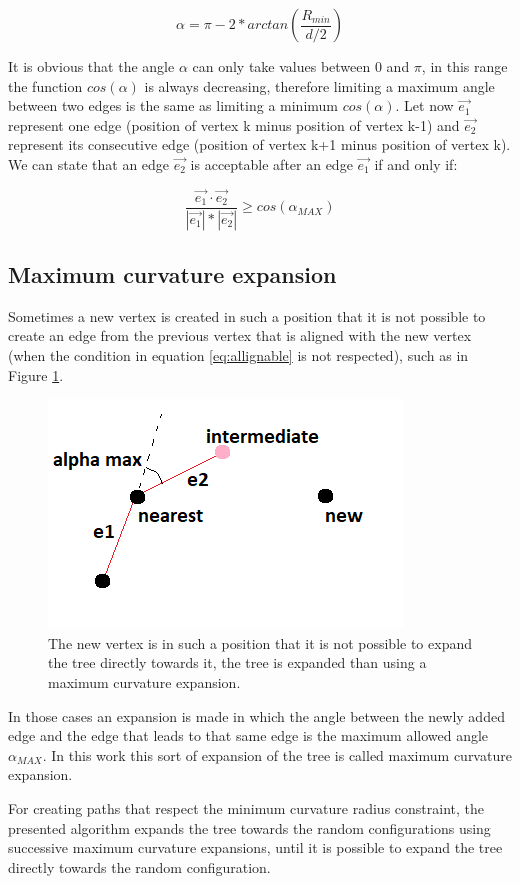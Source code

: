 \begin{equation}
    \alpha = \pi - 2 * arctan \left ( \frac{R_{min}}{d/2} \right )
\end{equation}

It is obvious that the angle $\alpha$ can only take values between $0$ and $\pi$, in this range the function $cos(\alpha)$ is always decreasing, therefore limiting a maximum angle between two edges is the same as limiting a minimum $cos(\alpha)$. Let now $\vec{e_1}$ represent one edge (position of vertex k minus position of vertex k-1) and  $\vec{e_2}$ represent its consecutive edge (position of vertex k+1 minus position of vertex k). We can state that an edge $\vec{e_2}$ is acceptable after an edge $\vec{e_1}$ if and only if:

\begin{equation}
    \frac{\vec{e_1} \cdot \vec{e_2} }{ |\vec{e_1}| * |\vec{e_2}|} \geq cos(\alpha_{MAX})
    \label{eq:allignable}
\end{equation}

\subsection{Maximum curvature expansion}
Sometimes a new vertex is created in such a position that it is not possible to create an edge from the previous vertex that is aligned with the new vertex (when the condition in equation \ref{eq:allignable} is not respected), such as in Figure \ref{fig:alignable}.



\begin{figure}[ht!]
    \centering
    \includegraphics[width=0.6\linewidth]{Figures/04_rrt/alignable.png}
    \caption{The new vertex is in such a position that it is not possible to expand the tree directly towards it, the tree is expanded than using a maximum curvature expansion.}
    \label{fig:alignable}
\end{figure}

In those cases an expansion is made in which the angle between the newly added edge and the edge that leads to that same edge is the maximum allowed angle $\alpha_{MAX}$. In this work this sort of expansion of the tree is called maximum curvature expansion.
\par
 For creating paths that respect the minimum curvature radius constraint, the presented algorithm expands the tree towards the random configurations using successive maximum curvature expansions, until it is possible to expand the tree directly towards the random configuration.

